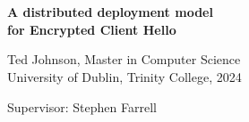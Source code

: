 \chapter*{}
\thispagestyle{empty}

\vspace*{0mm}
\begin{center}
\setlength{\unitlength}{1mm}

\begin{spacing}{2}
\textbf{\Large A distributed deployment model \\ for Encrypted Client Hello} \\[10mm]
\end{spacing}

\begin{spacing}{1.5}
Ted Johnson, Master in Computer Science \\
University of Dublin, Trinity College, 2024 \\[10mm]
\end{spacing}

Supervisor: Stephen Farrell \\
\end{center}
\vspace{5mm}

\begin{spacing}{1} \noindent
\blindtext
\blindtext
\end{spacing}

